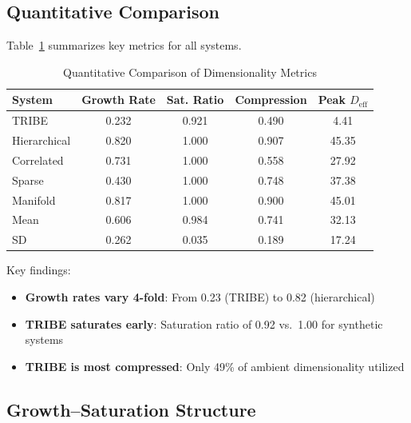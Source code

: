 \subsection{Quantitative Comparison}

Table~\ref{tab:quantitative} summarizes key metrics for all systems.

\begin{table}[htbp]
	\centering
	\caption{Quantitative Comparison of Dimensionality Metrics}
	\label{tab:quantitative}
	\begin{tabular}{@{}lcccc@{}}
		\toprule
		System       & Growth Rate & Sat. Ratio & Compression & Peak $D_{\mathrm{eff}}$ \\
		\midrule
		TRIBE        & 0.232       & 0.921      & 0.490       & 4.41                    \\
		Hierarchical & 0.820       & 1.000      & 0.907       & 45.35                   \\
		Correlated   & 0.731       & 1.000      & 0.558       & 27.92                   \\
		Sparse       & 0.430       & 1.000      & 0.748       & 37.38                   \\
		Manifold     & 0.817       & 1.000      & 0.900       & 45.01                   \\
		\midrule
		Mean         & 0.606       & 0.984      & 0.741       & 32.13                   \\
		SD           & 0.262       & 0.035      & 0.189       & 17.24                   \\
		\bottomrule
	\end{tabular}
\end{table}

Key findings:

\begin{itemize}
	\item \textbf{Growth rates vary 4-fold}: From 0.23 (TRIBE) to 0.82 (hierarchical)
	\item \textbf{TRIBE saturates early}: Saturation ratio of 0.92 vs.\ 1.00 for synthetic systems
	\item \textbf{TRIBE is most compressed}: Only 49\% of ambient dimensionality utilized
\end{itemize}

\subsection{Growth--Saturation Structure}

